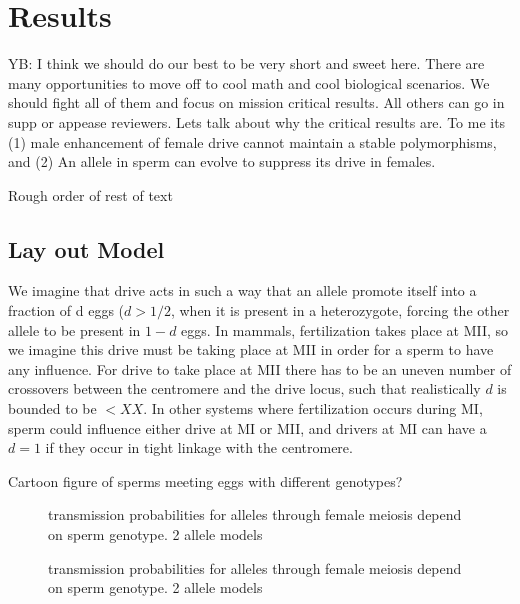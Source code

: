 \documentclass[12pt,letterpaper]{article}
\begin{document}
\section*{Results}

YB: I think we should do our best to be very short and sweet here. There are many opportunities to move off to cool math and cool biological scenarios. 
We should fight all of them and focus on mission critical results. All others can go in supp or appease reviewers. Lets talk about why the critical results are. To me its (1) male enhancement of female drive cannot maintain a stable polymorphisms, and (2) An allele in sperm can evolve to suppress its drive in females.


Rough order of rest of text
\subsection*{Lay out Model} 
We imagine that drive acts in such a way that an allele promote itself into a fraction of d
 eggs ($d> 1/2$, when it is present in a heterozygote, forcing the other allele to be present in $1-d$ eggs. 
In mammals, fertilization takes place at MII, so we imagine this drive must be taking place at MII in order
for a sperm to have any influence. For drive to take place at MII there has to be an uneven number of
 crossovers between the centromere and the drive locus, such that realistically $d$ is bounded to be $<XX$. 
In other systems where fertilization occurs during MI, sperm could influence either drive at MI or MII, 
and drivers at MI can have a $d=1$ if they occur in tight linkage with the centromere.

Cartoon figure of sperms meeting eggs with different genotypes? 

\begin{figure}
\caption{transmission probabilities for alleles through female
  meiosis depend on sperm genotype. 2 allele models}  
\label{Eggsperm_2_allele_cartoon}
\end{figure}


\begin{figure}
\caption{transmission probabilities for alleles through female
  meiosis depend on sperm genotype. 2 allele models}  
\label{Eggsperm_2_allele_cartoon}
\end{figure}
\end{document}
